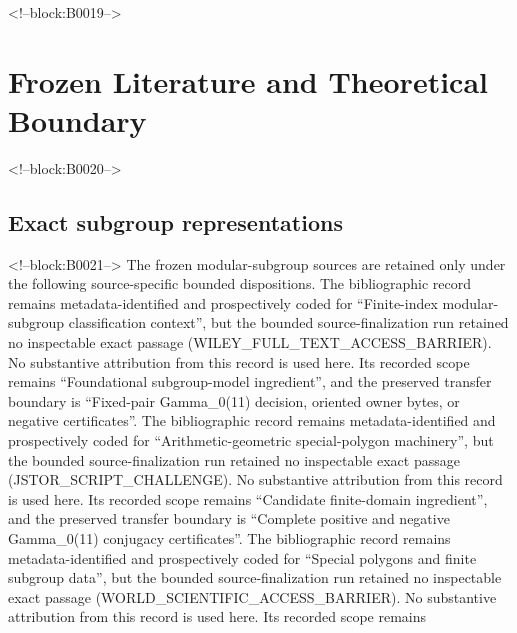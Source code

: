 \documentclass[11pt]{article}
\begin{document}
<!--block:B0019-->
\hypertarget{2-frozen-literature-and-theoretical-boundary}{%
\section{Frozen Literature and Theoretical
Boundary}\label{2-frozen-literature-and-theoretical-boundary}}

<!--block:B0020-->
\hypertarget{21-exact-subgroup-representations}{%
\subsection{Exact subgroup
representations}\label{21-exact-subgroup-representations}}

<!--block:B0021-->
The frozen modular-subgroup sources are retained only under the following source-specific bounded dispositions.
The bibliographic record \citep{P31-S01} remains metadata-identified and
prospectively coded for ``Finite-index modular-subgroup classification context'', but the bounded source-finalization
run retained no inspectable exact passage (WILEY\_FULL\_TEXT\_ACCESS\_BARRIER).  No substantive
attribution from this record is used here.  Its recorded scope remains
``Foundational subgroup-model ingredient'', and the preserved transfer boundary is ``Fixed-pair Gamma\_0(11) decision, oriented owner bytes, or negative certificates''.
The bibliographic record \citep{P31-S02} remains metadata-identified and
prospectively coded for ``Arithmetic-geometric special-polygon machinery'', but the bounded source-finalization
run retained no inspectable exact passage (JSTOR\_SCRIPT\_CHALLENGE).  No substantive
attribution from this record is used here.  Its recorded scope remains
``Candidate finite-domain ingredient'', and the preserved transfer boundary is ``Complete positive and negative Gamma\_0(11) conjugacy certificates''.
The bibliographic record \citep{P31-S03} remains metadata-identified and
prospectively coded for ``Special polygons and finite subgroup data'', but the bounded source-finalization
run retained no inspectable exact passage (WORLD\_SCIENTIFIC\_ACCESS\_BARRIER).  No substantive
attribution from this record is used here.  Its recorded scope remains
\end{document}
